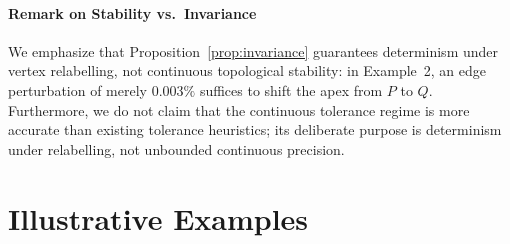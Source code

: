 \documentclass[preprint,12pt]{elsarticle}
\begin{document}
\paragraph{Remark on Stability vs.\ Invariance} We emphasize that Proposition~\ref{prop:invariance} guarantees determinism under vertex relabelling, not continuous topological stability: in Example~2, an edge perturbation of merely $0.003\%$ suffices to shift the apex from $P$ to $Q$. Furthermore, we do not claim that the continuous tolerance regime is more accurate than existing tolerance heuristics; its deliberate purpose is determinism under relabelling, not unbounded continuous precision.

\section{Illustrative Examples}
\end{document}
